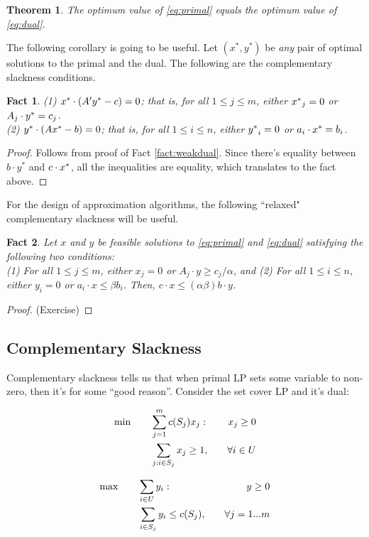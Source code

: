 \documentclass[11pt]{article}
\newtheorem{theorem}{Theorem}
\newtheorem{fact}{Fact}
\newlength{\lpbox}
\begin{document}
\begin{theorem}
The optimum value of \eqref{eq:primal} equals the optimum value of \eqref{eq:dual}.
\end{theorem}

The following corollary is going to be useful.
Let $(x^*,y^*)$ be {\em any} pair of optimal solutions to the primal and the dual. The following are the complementary slackness conditions.

\begin{fact}
(1) ${x^*}\cdot(A'{y^*} - c) = 0$; that is, for all $1\le j\le m$, either ${x^*}_j = 0$ or $A_j\cdot {y^*} = c_j$.\\
(2) ${y^*}\cdot(A{x^*} - b) = 0$; that is, for all $1\le i \le n$, either ${y^*}_i = 0$ or $a_i\cdot {x^*} = b_i$.
\end{fact}
\begin{proof}
Follows from proof of Fact \ref{fact:weakdual}. Since there's equality between $b\cdot y^*$ and $c\cdot{x^*}$, 
all the inequalities are equality, which translates to the fact above. 
\end{proof}

\noindent
For the design of approximation algorithms, the following ``relaxed" complementary slackness will be useful.
\begin{fact}\label{fact:relaxedcs}
Let $x$ and $y$ be feasible solutions to \eqref{eq:primal} and \eqref{eq:dual} satisfying the following two conditions: \\
(1) For all $1\le j\le m$, either $x_j =0$ or $A_j\cdot y \ge c_j/\alpha$, and (2) For all $1\le i \le n$, either $y_i = 0$ or $a_i\cdot x \le \beta b_i$. 
Then, $c\cdot x \le (\alpha\beta)b\cdot y$.
\end{fact}
\begin{proof}(Exercise)\end{proof}

\subsection*{Complementary Slackness}
Complementary slackness tells us that when primal LP sets some variable to non-zero, then it's for some ``good reason''. Consider the set cover LP and it's dual:

\begin{figure}[h]
  \begin{minipage}{\lpbox} \begin{align}
      \min &\qquad  \sum_{j=1}^m c(S_j)x_j: \quad& x_j \ge 0 \label{lp:sc} \\
      & \qquad \sum_{j: i \in S_j} x_j \ge 1, \quad& \forall
       i \in U \notag 
    \end{align} \end{minipage}
  \hfill \vline \hfill
  \begin{minipage}{\lpbox} \begin{align}
      \max & \qquad \sum_{i\in U} y_i: \quad& y \ge 0 \label{dual:sc} \\
      & \qquad \sum_{i \in S_j} y_i \le c(S_j), \quad&\forall j=1...m  \notag
    \end{align}\end{minipage}
\end{figure}
\end{document}
